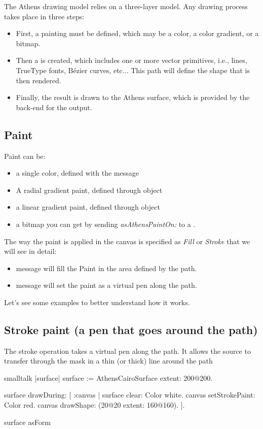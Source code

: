 \documentclass[10pt,twoside,english]{_support/latex/sbabook/sbabook}
\begin{document}
The Athens drawing model relies on a three-layer model. Any drawing process
takes place in three steps:

\begin{itemize}
    \item First, a painting must be defined, which may be a color, a color gradient, or a bitmap.
    \item Then a  is created, which includes one or more vector primitives, i.e., lines, TrueType fonts, B\'{e}zier curves, etc... This path will define the shape that is then rendered.
    \item Finally, the result is drawn to the Athens surface, which is provided by the back-end for the output.
\end{itemize}

\subsection{Paint}
Paint can be:

\begin{itemize}
    \item a single color, defined with the message 
    \item A radial gradient paint, defined through object 
    \item a linear gradient paint, defined through object 
    \item a bitmap you can get by sending \textit{asAthensPaintOn:} to a .
\end{itemize}

The way the paint is applied in the canvas is specified as \textit{Fill} or \textit{Stroke} that we will see in detail:

\begin{itemize}
    \item {} message will fill the Paint in the area defined by the path.
    \item {} message will set the paint as a virtual pen along the path.
\end{itemize}

Let's see some examples to better understand how it works.

\subsection{Stroke paint (a pen that goes around the path)}
The stroke operation takes a virtual pen along the path. It allows the source to transfer through the mask in a thin (or thick) line around the path
\begin{displaycode}{smalltalk}
|surface|
surface := AthensCairoSurface extent: 200@200.

surface drawDuring: [ :canvas | 
        surface clear: Color white.
        canvas setStrokePaint:  Color red.
        canvas drawShape: (20@20 extent: 160@160). 
].

surface asForm
\end{displaycode}
\end{document}
